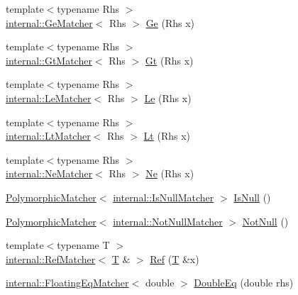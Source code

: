 \begin{DoxyCompactItemize}
\item 
{\footnotesize template$<$typename Rhs $>$ }\\\hyperlink{classtesting_1_1internal_1_1_ge_matcher}{internal\+::\+Ge\+Matcher}$<$ Rhs $>$ \hyperlink{namespacetesting_a42bb19b42d7830b972973a103d5e00f2}{Ge} (Rhs x)
\item 
{\footnotesize template$<$typename Rhs $>$ }\\\hyperlink{classtesting_1_1internal_1_1_gt_matcher}{internal\+::\+Gt\+Matcher}$<$ Rhs $>$ \hyperlink{namespacetesting_a493fc1bafd7b3945ba06ace80e74b0d5}{Gt} (Rhs x)
\item 
{\footnotesize template$<$typename Rhs $>$ }\\\hyperlink{classtesting_1_1internal_1_1_le_matcher}{internal\+::\+Le\+Matcher}$<$ Rhs $>$ \hyperlink{namespacetesting_a2e33596921b80a7fdaff3f62bf18a478}{Le} (Rhs x)
\item 
{\footnotesize template$<$typename Rhs $>$ }\\\hyperlink{classtesting_1_1internal_1_1_lt_matcher}{internal\+::\+Lt\+Matcher}$<$ Rhs $>$ \hyperlink{namespacetesting_ad621459957a8bcdd3c256b7940ecbf99}{Lt} (Rhs x)
\item 
{\footnotesize template$<$typename Rhs $>$ }\\\hyperlink{classtesting_1_1internal_1_1_ne_matcher}{internal\+::\+Ne\+Matcher}$<$ Rhs $>$ \hyperlink{namespacetesting_afe42d41d5171234cb9da5da27faeb7e8}{Ne} (Rhs x)
\item 
\hyperlink{classtesting_1_1_polymorphic_matcher}{Polymorphic\+Matcher}$<$ \hyperlink{classtesting_1_1internal_1_1_is_null_matcher}{internal\+::\+Is\+Null\+Matcher} $>$ \hyperlink{namespacetesting_a56ffb1a169c14ce585fc5bed32add2db}{Is\+Null} ()
\item 
\hyperlink{classtesting_1_1_polymorphic_matcher}{Polymorphic\+Matcher}$<$ \hyperlink{classtesting_1_1internal_1_1_not_null_matcher}{internal\+::\+Not\+Null\+Matcher} $>$ \hyperlink{namespacetesting_a39d1f92b53b8b2a0b6db6a22ac146416}{Not\+Null} ()
\item 
{\footnotesize template$<$typename T $>$ }\\\hyperlink{classtesting_1_1internal_1_1_ref_matcher}{internal\+::\+Ref\+Matcher}$<$ \hyperlink{functions__7_8js_adf1f3edb9115acb0a1e04209b7a9937b}{T} \& $>$ \hyperlink{namespacetesting_a0a4a364121ea3fa656a112f1c2e6b7a4}{Ref} (\hyperlink{functions__7_8js_adf1f3edb9115acb0a1e04209b7a9937b}{T} \&x)
\item 
\hyperlink{classtesting_1_1internal_1_1_floating_eq_matcher}{internal\+::\+Floating\+Eq\+Matcher}$<$ double $>$ \hyperlink{namespacetesting_a1f49f9d97f03bfa4db26888f03486a9f}{Double\+Eq} (double rhs)

\end{DoxyCompactItemize}
